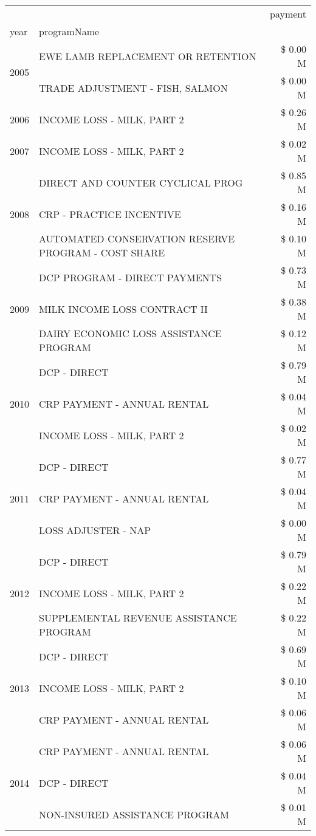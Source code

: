 \begin{tabular}{llr}
\toprule
 &  & payment \\
year & programName &  \\
\midrule
\multirow[t]{2}{*}{2005} & EWE LAMB REPLACEMENT OR RETENTION & \$ 0.00 M \\
 & TRADE ADJUSTMENT - FISH, SALMON & \$ 0.00 M \\
\cline{1-3}
2006 & INCOME LOSS - MILK, PART 2 & \$ 0.26 M \\
\cline{1-3}
2007 & INCOME LOSS - MILK, PART 2 & \$ 0.02 M \\
\cline{1-3}
\multirow[t]{3}{*}{2008} & DIRECT AND COUNTER CYCLICAL PROG & \$ 0.85 M \\
 & CRP - PRACTICE INCENTIVE & \$ 0.16 M \\
 & AUTOMATED CONSERVATION RESERVE PROGRAM - COST SHARE & \$ 0.10 M \\
\cline{1-3}
\multirow[t]{3}{*}{2009} & DCP PROGRAM - DIRECT PAYMENTS & \$ 0.73 M \\
 & MILK INCOME LOSS CONTRACT II & \$ 0.38 M \\
 & DAIRY ECONOMIC LOSS ASSISTANCE PROGRAM & \$ 0.12 M \\
\cline{1-3}
\multirow[t]{3}{*}{2010} & DCP - DIRECT & \$ 0.79 M \\
 & CRP PAYMENT - ANNUAL RENTAL & \$ 0.04 M \\
 & INCOME LOSS - MILK, PART 2 & \$ 0.02 M \\
\cline{1-3}
\multirow[t]{3}{*}{2011} & DCP - DIRECT & \$ 0.77 M \\
 & CRP PAYMENT - ANNUAL RENTAL & \$ 0.04 M \\
 & LOSS ADJUSTER - NAP & \$ 0.00 M \\
\cline{1-3}
\multirow[t]{3}{*}{2012} & DCP - DIRECT & \$ 0.79 M \\
 & INCOME LOSS - MILK, PART 2 & \$ 0.22 M \\
 & SUPPLEMENTAL REVENUE ASSISTANCE PROGRAM & \$ 0.22 M \\
\cline{1-3}
\multirow[t]{3}{*}{2013} & DCP - DIRECT & \$ 0.69 M \\
 & INCOME LOSS - MILK, PART 2 & \$ 0.10 M \\
 & CRP PAYMENT - ANNUAL RENTAL & \$ 0.06 M \\
\cline{1-3}
\multirow[t]{3}{*}{2014} & CRP PAYMENT - ANNUAL RENTAL & \$ 0.06 M \\
 & DCP - DIRECT & \$ 0.04 M \\
 & NON-INSURED ASSISTANCE PROGRAM & \$ 0.01 M \\

\end{tabular}
